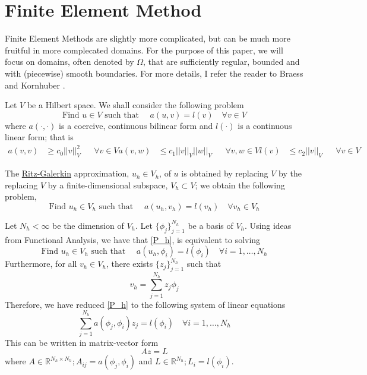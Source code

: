 \documentclass[a4paper,10pt,oneside]{book}
\theoremstyle{plain}%
\theoremstyle{definition}
\theoremstyle{remark}
\newcommand{\bbR}{\mathbb{R}}
\begin{document}
\section{Finite Element Method}
Finite Element Methods are slightly more complicated, but can be much more
fruitful in more complecated domains. For the purpose of this paper, we will
focus on domains, often denoted by $\Omega$, that are sufficiently regular,
bounded and with (piecewise) smooth boundaries. For more details, I refer the
reader to Braess \cite{Braess01} and Kornhuber \cite{Kornhuber08}.

Let $V$ be a Hilbert space. We shall consider the following problem
\begin{equation}
 \text{Find }u\in V\text{ such that }\quad a(u,v)=l(v)\quad\forall v\in V
\end{equation}
where $a(\cdot,\cdot)$ is a coercive, continuous bilinear form and $l(\cdot)$
is a continuous linear form; that is
\begin{align}
 a(v,v)&\geq c_0||v||_V^2&&\forall v\in V
 a(v,w)&\leq c_1||v||_V||w||_V&&\forall v,w\in V
 l(v)&\leq c_2||v||_V&&\forall v\in V
\end{align}

The \underline{Ritz-Galerkin} approximation, $u_h\in V_h$, of $u$ is obtained
by replacing $V$ by the replacing $V$ by a finite-dimensional subspace,
$V_h\subset V$; we obtain the following problem,
\begin{equation}
 \text{Find }u_h\in V_h\text{ such that }\quad a(u_h,v_h)=l(v_h)\quad\forall
v_h\in V_h\label{P_h}
\end{equation}

Let $N_h<\infty$ be the dimension of $V_h$. Let $\{\phi_j\}_{j=1}^{N_h}$ be a
basis of $V_h$. Using ideas from Functional Analysis, we have that \eqref{P_h},
is equivalent to solving
\begin{equation}
 \text{Find }u_h\in V_h\text{ such that }\quad
a(u_h,\phi_i)=l(\phi_i)\quad\forall i=1,\dots,N_h
\end{equation}
Furthermore, for all $v_h\in V_h$, there exists $\{z_j\}_{j=1}^{N_h}$ such that
\[v_h=\sum_{j=1}^{N_h}z_j\phi_j\]
Therefore, we have reduced \eqref{P_h} to the following system of linear
equations
\begin{equation}
 \sum_{j=1}^{N_h}a(\phi_j, \phi_i)z_j=l(\phi_i)\quad\forall i=1,\dots,N_h
\end{equation}
This can be written in matrix-vector form
\begin{equation}
 Az=L
\end{equation}
where $A\in\bbR^{N_h\times N_h};A_{ij}=a(\phi_j, \phi_i)$ and
$L\in\bbR^{N_h};L_i=l(\phi_i)$.
\end{document}
